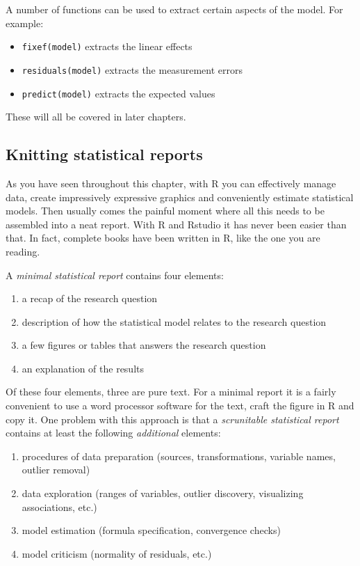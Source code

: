 \documentclass[]{svmono}
\providecommand{\tightlist}{%
  \setlength{\itemsep}{0pt}\setlength{\parskip}{0pt}}
\begin{document}
A number of functions can be used to extract certain aspects of the
model. For example:

\begin{itemize}
\tightlist
\item
  \texttt{fixef(model)} extracts the linear effects
\item
  \texttt{residuals(model)} extracts the measurement errors
\item
  \texttt{predict(model)} extracts the expected values
\end{itemize}

These will all be covered in later chapters.

\subsection{Knitting statistical
reports}\label{knitting-statistical-reports}

As you have seen throughout this chapter, with R you can effectively
manage data, create impressively expressive graphics and conveniently
estimate statistical models. Then usually comes the painful moment where
all this needs to be assembled into a neat report. With R and Rstudio it
has never been easier than that. In fact, complete books have been
written in R, like the one you are reading.

A \emph{minimal statistical report} contains four elements:

\begin{enumerate}
\def\labelenumi{\arabic{enumi}.}
\tightlist
\item
  a recap of the research question
\item
  description of how the statistical model relates to the research
  question
\item
  a few figures or tables that answers the research question
\item
  an explanation of the results
\end{enumerate}

Of these four elements, three are pure text. For a minimal report it is
a fairly convenient to use a word processor software for the text, craft
the figure in R and copy it. One problem with this approach is that a
\emph{scrunitable statistical report} contains at least the following
\emph{additional} elements:

\begin{enumerate}
\def\labelenumi{\arabic{enumi}.}
\tightlist
\item
  procedures of data preparation (sources, transformations, variable
  names, outlier removal)
\item
  data exploration (ranges of variables, outlier discovery, visualizing
  associations, etc.)
\item
  model estimation (formula specification, convergence checks)
\item
  model criticism (normality of residuals, etc.)
\end{enumerate}
\end{document}
